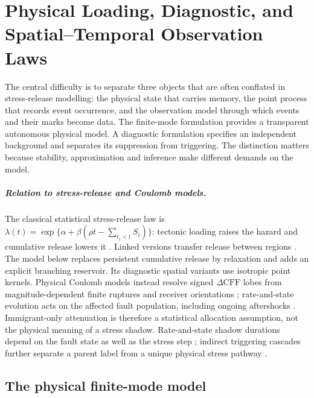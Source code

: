 \chapter{Physical Loading, Diagnostic, and Spatial--Temporal Observation Laws}\label{chap:models}\label{ch:models}

The central difficulty is to separate three objects that are often conflated in stress-release modelling: the physical state that carries memory, the point process that records event occurrence, and the observation model through which events and their marks become data. The finite-mode formulation provides a transparent autonomous physical model. A diagnostic formulation specifies an independent background and separates its suppression from triggering. The distinction matters because stability, approximation and inference make different demands on the model.

\paragraph{Relation to stress-release and Coulomb models.}
The classical statistical stress-release law is
$\lambda(t)=\exp\{\alpha+\beta(\rho t-\sum_{t_i<t}S_i)\}$: tectonic loading
raises the hazard and cumulative release lowers it
\citep{VereJones1978,VereJones1988,ZhengVereJones1991,ZhengVereJones1994}.
Linked versions transfer release between regions \citep{BebbingtonHarte2003}.
The model below replaces persistent cumulative release by relaxation and adds
an explicit branching reservoir. Its diagnostic spatial variants use
isotropic point kernels. Physical Coulomb models instead resolve signed
$\Delta\mathrm{CFF}$ lobes from magnitude-dependent finite ruptures and receiver
orientations \citep{KingSteinLin1994,Stein1999}; rate-and-state evolution acts
on the affected fault population, including ongoing aftershocks
\citep{Dieterich1994,TodaEtAl2005}. Immigrant-only attenuation is therefore a
statistical allocation assumption, not the physical meaning of a stress shadow.
Rate-and-state shadow durations depend on the fault state as well as the stress
step \citep{HarrisSimpson1998}; indirect triggering cascades further separate a
parent label from a unique physical stress pathway \citep{MarsanLengline2008}.

\section{The physical finite-mode model}\label{sec:model_physical}

